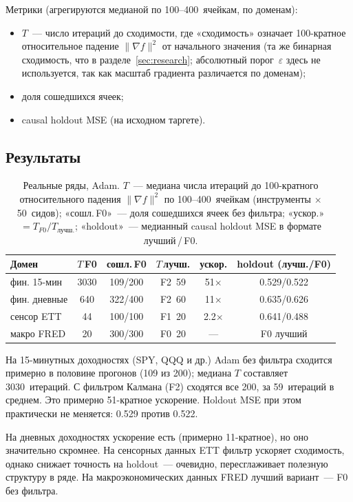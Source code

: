 \documentclass[conference]{IEEEtran}
\begin{document}
Метрики (агрегируются медианой по 100--400~ячейкам, по доменам):
\begin{itemize}
  \item $T$~--- число итераций до сходимости, где «сходимость» означает
        100-кратное относительное падение $\|\nabla f\|^2$ от начального
        значения (та же бинарная сходимость, что в разделе~\ref{sec:research};
        абсолютный порог~$\varepsilon$ здесь не используется, так как
        масштаб градиента различается по доменам);
  \item доля сошедшихся ячеек;
  \item causal holdout MSE (на исходном таргете).
\end{itemize}

\subsection{Результаты}

\begin{table}[H]
\centering\footnotesize
\setlength{\tabcolsep}{4pt}
\caption{Реальные ряды, Adam. $T$~--- медиана числа итераций до
100-кратного относительного падения $\|\nabla f\|^2$ по 100--400~ячейкам
(инструменты $\times$ 50~сидов); «сошл.\,F0»~--- доля сошедшихся ячеек
без фильтра; «ускор.»${}=T_{F0}/T_{\text{лучш.}}$; «holdout»~--- медианный
causal holdout MSE в формате лучший\,/\,F0.}
\label{tab:real}
\begin{tabular}{lccccc}
\toprule
Домен & $T$\,F0 & сошл.\,F0 & $T$\,лучш. & ускор. & holdout (лучш./F0)\\
\midrule
фин. 15-мин   & 3030 & 109/200 & F2\ 59 & 51$\times$ & 0.529/0.522 \\
фин. дневные  & 640  & 322/400 & F2\ 60 & 11$\times$ & 0.635/0.626 \\
сенсор ETT    & 44   & 100/100 & F1\ 20 & 2.2$\times$ & 0.641/0.488 \\
макро FRED    & 20   & 300/300 & F0\ 20 & ---        & F0 лучший  \\
\bottomrule
\end{tabular}
\end{table}


На 15-минутных доходностях (SPY, QQQ и др.) Adam без фильтра сходится
примерно в половине прогонов (109 из 200); медиана $T$ составляет
3030~итераций. С фильтром Калмана (F2) сходятся все 200, за 59~итераций
в среднем. Это примерно 51-кратное ускорение. Holdout MSE при этом
практически не меняется: 0.529 против 0.522.

На дневных доходностях ускорение есть (примерно 11-кратное), но оно
значительно скромнее. На сенсорных данных ETT фильтр ускоряет
сходимость, однако снижает точность на holdout~--- очевидно,
пересглаживает полезную структуру в ряде. На макроэкономических данных
FRED лучший вариант~--- F0 без фильтра.
\end{document}
